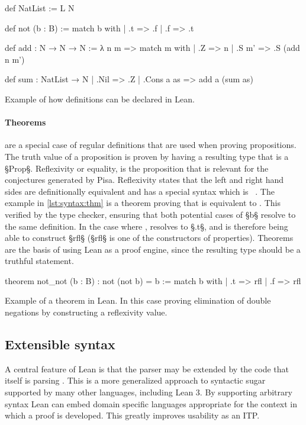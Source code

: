 \begin{listing}[ht]
\begin{LeanCode}
def NatList := L N

def not (b : B) :=
  match b with | .t => .f | .f => .t

def add : N → N → N := λ n m =>
  match m with | .Z => n | .S m' => .S (add n m')

def sum : NatList → N
  | .Nil => .Z
  | .Cons a as => add a (sum as)
\end{LeanCode}
\caption{Example of how definitions can be declared in Lean.}
\label{lst:syntax:def}
\end{listing}

\paragraph*{Theorems} are a special case of regular definitions that are used when proving propositions.
The truth value of a proposition is proven by having a resulting type that is a §Prop§.
Reflexivity or equality, is the proposition that is relevant for the conjectures generated by Pisa.
Reflexivity states that the left and right hand sides are definitionally equivalent and has a special syntax which is ~\autocite{rfl}.
The example in \cref{lst:syntax:thm} is a theorem proving that  is equivalent to .
This verified by the type checker, ensuring that both potential cases of §b§ resolve to the same definition.
In the case where ,  resolves to §.t§, and is therefore being able to construct §rfl§ (§rfl§ is one of the constructors of properties).
Theorems are the basis of using Lean as a proof engine, since the resulting type should be a truthful statement.

\begin{listing}[ht]
\begin{LeanCode}
theorem not_not (b : B) : not (not b) = b :=
  match b with | .t => rfl | .f => rfl
\end{LeanCode}
\caption
  [Example of a theorem proving elimination of double negations.]
  {Example of a theorem in Lean. In this case proving elimination of double negations by constructing a reflexivity value.}
\label{lst:syntax:thm}
\end{listing}

\subsection{Extensible syntax}\label{sec:lean:extensible-syntax}
A central feature of Lean is that the parser may be extended by the code that itself is parsing \autocite{LeanMacros}.
This is a more generalized approach to syntactic sugar supported by many other languages, including Lean 3.
By supporting arbitrary syntax Lean can embed domain specific languages appropriate for the context in which a proof is developed.
This greatly improves usability as an ITP.

